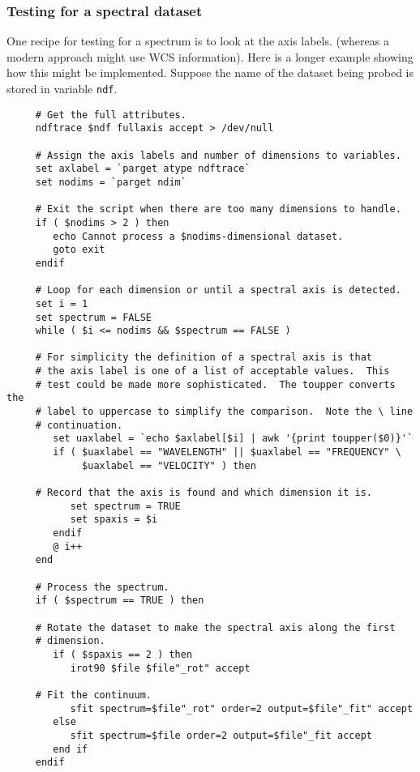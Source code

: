 \documentclass[twoside,11pt]{article}
\newcommand{\xlabel}[1]{}
\begin{document}
\newpage
\subsubsection{\xlabel{sc4_se_dataset_spectrum}Testing for a spectral
dataset\label{sc4_se_dataset_spectrum}}

One recipe for testing for a spectrum is to look at the axis labels.
(whereas a modern approach might use WCS information). Here is a
longer example showing how this might be implemented.
Suppose the name of the dataset being probed is stored in variable
{\tt ndf}.

\small
\begin{verbatim}
     # Get the full attributes.
     ndftrace $ndf fullaxis accept > /dev/null

     # Assign the axis labels and number of dimensions to variables.
     set axlabel = `parget atype ndftrace`
     set nodims = `parget ndim`
     
     # Exit the script when there are too many dimensions to handle.
     if ( $nodims > 2 ) then
        echo Cannot process a $nodims-dimensional dataset.
        goto exit
     endif

     # Loop for each dimension or until a spectral axis is detected.
     set i = 1
     set spectrum = FALSE
     while ( $i <= nodims && $spectrum == FALSE )

     # For simplicity the definition of a spectral axis is that
     # the axis label is one of a list of acceptable values.  This
     # test could be made more sophisticated.  The toupper converts the
     # label to uppercase to simplify the comparison.  Note the \ line
     # continuation.
        set uaxlabel = `echo $axlabel[$i] | awk '{print toupper($0)}'`
        if ( $uaxlabel == "WAVELENGTH" || $uaxlabel == "FREQUENCY" \
             $uaxlabel == "VELOCITY" ) then

     # Record that the axis is found and which dimension it is.
           set spectrum = TRUE
           set spaxis = $i
        endif
        @ i++
     end
     
     # Process the spectrum.
     if ( $spectrum == TRUE ) then

     # Rotate the dataset to make the spectral axis along the first
     # dimension.
        if ( $spaxis == 2 ) then
           irot90 $file $file"_rot" accept

     # Fit the continuum.
           sfit spectrum=$file"_rot" order=2 output=$file"_fit" accept
        else
           sfit spectrum=$file order=2 output=$file"_fit accept
        end if
     endif
\end{verbatim}
\normalsize
\end{document}
